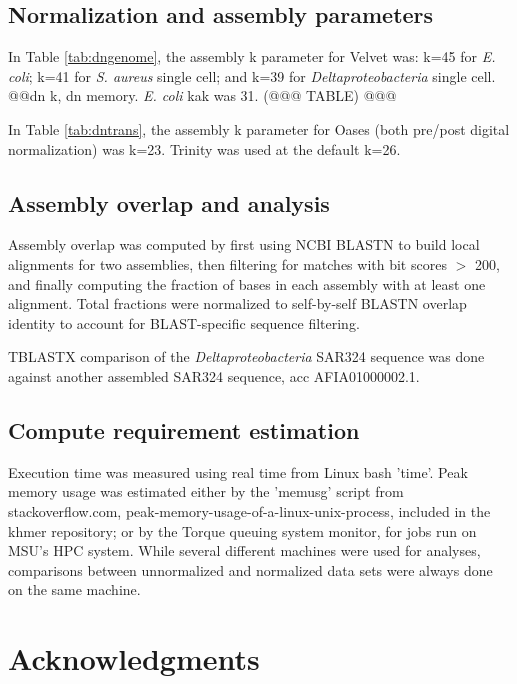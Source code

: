 \documentclass[10pt]{article}
\begin{document}
\subsection*{Normalization and assembly parameters}

In Table \ref{tab:dngenome}, the assembly k parameter for Velvet was:
k=45 for {\em E. coli}; k=41 for {\em S. aureus} single cell; and k=39
for {\em Deltaproteobacteria} single cell.  @@dn k, dn memory.
{\em E. coli} kak was 31.  (@@@ TABLE) @@@

In Table \ref{tab:dntrans}, the assembly k parameter for Oases (both
pre/post digital normalization) was k=23.  Trinity was used at the
default k=26.

\subsection*{Assembly overlap and analysis}

Assembly overlap was computed by first using NCBI BLASTN to build local
alignments for two assemblies, then filtering for matches with bit scores
$>$ 200, and finally computing the fraction of bases in each assembly
with at least one alignment.  Total fractions were normalized to
self-by-self BLASTN overlap identity to account for BLAST-specific
sequence filtering.

TBLASTX comparison of the {\em Deltaproteobacteria} SAR324 sequence
was done against another assembled SAR324 sequence, acc AFIA01000002.1.

\subsection*{Compute requirement estimation}

Execution time was measured using real time from Linux bash 'time'.
Peak memory usage was estimated either by the 'memusg' script from
stackoverflow.com, peak-memory-usage-of-a-linux-unix-process, included
in the khmer repository; or by the Torque queuing system monitor, for
jobs run on MSU's HPC system.  While several different machines were
used for analyses, comparisons between unnormalized and normalized
data sets were always done on the same machine.

\section*{Acknowledgments}
\end{document}
